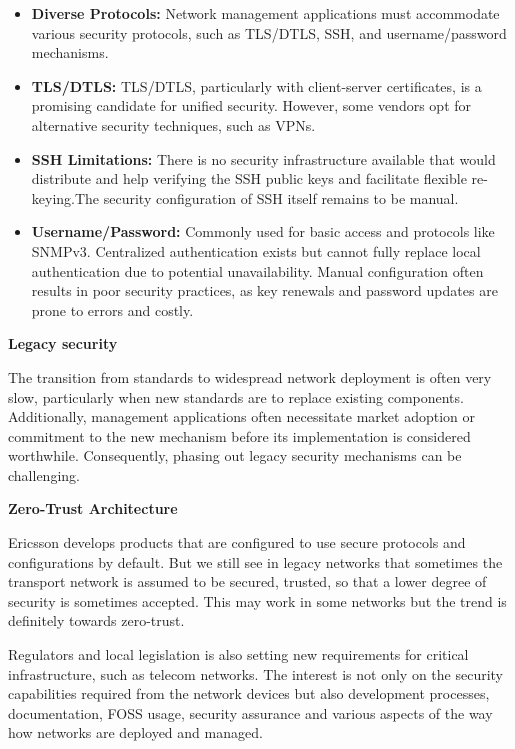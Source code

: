 \documentclass[10pt,sigconf]{iabart}
\begin{document}
\begin{itemize}
    \item \textbf{Diverse Protocols:} Network management applications must accommodate various security protocols, such as TLS/DTLS, SSH, and username/password mechanisms.
    \item \textbf{TLS/DTLS:} TLS/DTLS, particularly with client-server certificates, is a promising candidate for unified security. However, some vendors opt for alternative security techniques, such as VPNs.
    \item \textbf{SSH Limitations:} There is no security infrastructure available that would distribute and help verifying the SSH public keys and facilitate flexible re-keying.The security configuration of SSH itself remains to be manual. %
    \item \textbf{Username/Password:} Commonly used for basic access and protocols like SNMPv3. Centralized authentication exists but cannot fully replace local authentication due to potential unavailability. Manual configuration often results in poor security practices, as key renewals and password updates are prone to errors and costly.

\end{itemize}
 
\textbf{Legacy security}

The transition from standards to widespread network deployment is often very slow, particularly when new standards are to replace existing components. Additionally, management applications often necessitate market adoption or commitment to the new mechanism before its implementation is considered worthwhile. Consequently, phasing out legacy security mechanisms can be challenging.
 
\textbf{Zero-Trust Architecture}

Ericsson develops products that are configured to use secure protocols and configurations by default. But we still see in legacy networks that sometimes the transport network is assumed to be secured, trusted, so that a lower degree of security is sometimes accepted. This may work in some networks but the trend is definitely towards zero-trust. 

Regulators and local legislation is also setting new requirements for critical infrastructure, such as telecom networks. The interest is not only on the security capabilities required from the network devices but also development processes, documentation, FOSS usage, security assurance and various aspects of the way how networks are deployed and managed.
\end{document}
